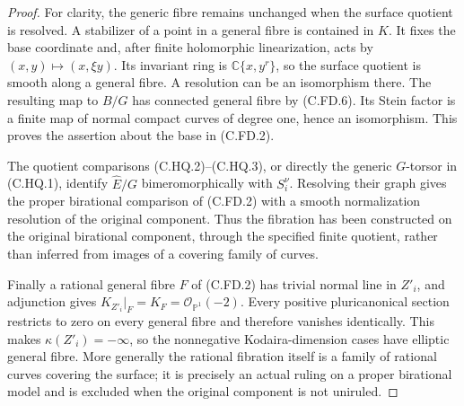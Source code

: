 \begin{proof}
For clarity, the generic fibre remains unchanged when the
surface quotient is resolved. A stabilizer of a point in a
general fibre is contained in $K$. It fixes the base coordinate
and, after finite holomorphic linearization, acts by
$(x,y)\mapsto(x,\xi y)$. Its invariant ring is
$\mathbb C\{x,y^r\}$, so the surface quotient is smooth
along a general fibre. A resolution can be an isomorphism
there. The resulting map to $B/G$ has connected general
fibre by (C.FD.6). Its Stein factor is a finite map of normal
compact curves of degree one, hence an isomorphism. This
proves the assertion about the base in (C.FD.2).

The quotient comparisons (C.HQ.2)--(C.HQ.3), or directly
the generic $G$-torsor in (C.HQ.1), identify
$\widehat E/G$ bimeromorphically with $S_i^\nu$.
Resolving their graph gives the proper birational comparison
of (C.FD.2) with a smooth normalization resolution of the
original component. Thus the fibration has been constructed
on the original birational component, through the specified
finite quotient, rather than inferred from images of a
covering family of curves.

Finally a rational general fibre $F$ of (C.FD.2) has trivial
normal line in $Z'_i$, and adjunction gives
$K_{Z'_i}|_F=K_F=\mathcal O_{\mathbb P^1}(-2)$.
Every positive pluricanonical section restricts to zero on
every general fibre and therefore vanishes identically.
This makes $\kappa(Z'_i)=-\infty$, so the nonnegative
Kodaira-dimension cases have elliptic general fibre.
More generally the rational fibration itself is a family
of rational curves covering the surface; it is precisely
an actual ruling on a proper birational model and is
excluded when the original component is not uniruled.
\end{proof}
